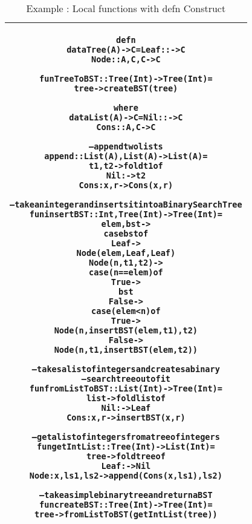 \documentclass[11pt]{article}
\begin{document}
\begin{table}
\begin{center}
\begin{tabular}{|c|} \hline
\begin{minipage}{5in}
\begin{alltt}
  defn
    data Tree(A) -> C = Leaf :: -> C
                        Node :: A,C,C -> C

    fun TreeToBST :: Tree(Int) -> Tree(Int) =
      tree -> createBST(tree)

  where 
    data List(A) -> C = Nil  ::     -> C
                        Cons :: A,C -> C 
    
    -- append two lists
    append :: List(A),List(A) -> List(A) =
      t1,t2 -> fold t1 of
                 Nil  :    -> t2
                 Cons :x,r -> Cons(x,r)

    -- take an integer and inserts it into a Binary Search Tree 
    fun insertBST :: Int,Tree(Int) -> Tree(Int) =
      elem,bst ->
        case bst of
          Leaf -> 
            Node (elem,Leaf,Leaf) 
          Node(n,t1,t2) -> 
            case (n == elem) of
              True  -> 
                bst 
              False ->
                case (elem < n) of
                  True ->
                    Node (n,insertBST (elem,t1),t2)
                  False ->
                    Node (n,t1,insertBST(elem,t2))

    -- takes a list of integers and creates a binary
    -- search tree out of it
    fun fromListToBST :: List(Int) -> Tree(Int) =
      list -> fold list of
                Nil  :     -> Leaf
                Cons : x,r -> insertBST(x,r)  
    
    -- get a list of integers from a tree of integers
    fun getIntList :: Tree(Int) -> List(Int) = 
      tree -> fold tree of
                Leaf : -> Nil
                Node :x,ls1,ls2 -> append (Cons(x,ls1),ls2)

    -- take a simple binary tree and return a BST
    fun createBST :: Tree(Int) -> Tree(Int) =
      tree -> fromListToBST (getIntList (tree))
\end{alltt} 
\end {minipage} 
\tabularnewline
\hline
\end{tabular}
\caption{Example : Local functions with {\sf defn} Construct}
\label{lam:defnExample}
\end{center}
\end{table}
\end{document}
